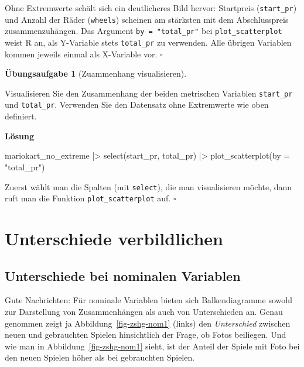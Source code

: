 \documentclass[
  letterpaper,
  twoside,
  open=any]{scrbook}
\newenvironment{Shaded}{\begin{snugshade}}{\end{snugshade}}
\newcommand{\AttributeTok}[1]{\textcolor[rgb]{0.40,0.45,0.13}{#1}}
\newcommand{\FunctionTok}[1]{\textcolor[rgb]{0.28,0.35,0.67}{#1}}
\newcommand{\NormalTok}[1]{\textcolor[rgb]{0.00,0.23,0.31}{#1}}
\newcommand{\SpecialCharTok}[1]{\textcolor[rgb]{0.37,0.37,0.37}{#1}}
\newcommand{\StringTok}[1]{\textcolor[rgb]{0.13,0.47,0.30}{#1}}
\theoremstyle{definition}
\newtheorem{exercise}{Übungsaufgabe}[chapter]
\theoremstyle{definition}
\theoremstyle{definition}
\theoremstyle{remark}
\begin{document}
Ohne Extremwerte schält sich ein deutlicheres Bild hervor: Startpreis
(\texttt{start\_pr}) und Anzahl der Räder (\texttt{wheels}) scheinen am
stärksten mit dem Abschlusspreis zusammenzuhängen. Das Argument
\texttt{by\ =\ "total\_pr"} bei \texttt{plot\_scatterplot} weist R an,
als Y-Variable stets \texttt{total\_pr} zu verwenden. Alle übrigen
Variablen kommen jeweils einmal als X-Variable vor. \(\square\)

\begin{exercise}[Zuammenhang
visualisieren]\protect\hypertarget{exr-zsmnhang-metrisch}{}\label{exr-zsmnhang-metrisch}

Visualisieren Sie den Zusammenhang der beiden metrischen Variablen
\texttt{start\_pr} und \texttt{total\_pr}. Verwenden Sie den Datensatz
ohne Extremwerte wie oben definiert.

\textbf{Lösung}

\begin{Shaded}
\begin{Highlighting}[]
\NormalTok{mariokart\_no\_extreme }\SpecialCharTok{|\textgreater{}} 
  \FunctionTok{select}\NormalTok{(start\_pr, total\_pr) }\SpecialCharTok{|\textgreater{}} 
  \FunctionTok{plot\_scatterplot}\NormalTok{(}\AttributeTok{by =} \StringTok{"total\_pr"}\NormalTok{)}
\end{Highlighting}
\end{Shaded}

Zuerst wählt man die Spalten (mit \texttt{select}), die man
visualisieren möchte, dann ruft man die Funktion
\texttt{plot\_scatterplot} auf. \(\square\)

\end{exercise}

\section{Unterschiede verbildlichen}\label{unterschiede-verbildlichen}

\subsection{Unterschiede bei nominalen
Variablen}\label{unterschiede-bei-nominalen-variablen}

Gute Nachrichten: Für nominale Variablen bieten sich Balkendiagramme
sowohl zur Darstellung von Zusammenhängen als auch von Unterschieden an.
Genau genommen zeigt ja Abbildung~\ref{fig-zshg-nom1} (links) den
\emph{Unterschied} zwischen neuen und gebrauchten Spielen hinsichtlich
der Frage, ob Fotos beiliegen. Und wie man in
Abbildung~\ref{fig-zshg-nom1} sieht, ist der Anteil der Spiele mit Foto
bei den neuen Spielen höher als bei gebrauchten Spielen.
\end{document}
